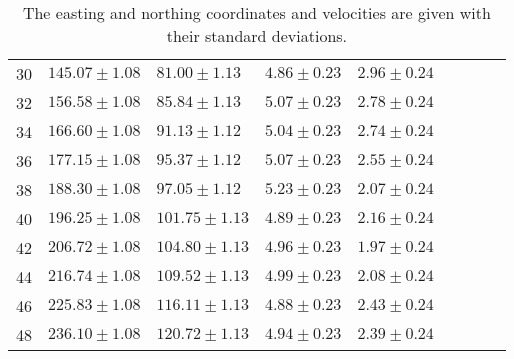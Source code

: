 \begin{table}[h]
\begin{center}
\begin{tabular}{lllllllll}
30 & $  145.07 \pm     1.08$ & $   81.00 \pm     1.13$ & $    4.86 \pm     0.23$ & $    2.96 \pm     0.24$  \\ 
32 & $  156.58 \pm     1.08$ & $   85.84 \pm     1.13$ & $    5.07 \pm     0.23$ & $    2.78 \pm     0.24$  \\ 
34 & $  166.60 \pm     1.08$ & $   91.13 \pm     1.12$ & $    5.04 \pm     0.23$ & $    2.74 \pm     0.24$  \\ 
36 & $  177.15 \pm     1.08$ & $   95.37 \pm     1.12$ & $    5.07 \pm     0.23$ & $    2.55 \pm     0.24$  \\ 
38 & $  188.30 \pm     1.08$ & $   97.05 \pm     1.12$ & $    5.23 \pm     0.23$ & $    2.07 \pm     0.24$  \\ 
40 & $  196.25 \pm     1.08$ & $  101.75 \pm     1.13$ & $    4.89 \pm     0.23$ & $    2.16 \pm     0.24$  \\ 
42 & $  206.72 \pm     1.08$ & $  104.80 \pm     1.13$ & $    4.96 \pm     0.23$ & $    1.97 \pm     0.24$  \\ 
44 & $  216.74 \pm     1.08$ & $  109.52 \pm     1.13$ & $    4.99 \pm     0.23$ & $    2.08 \pm     0.24$  \\ 
46 & $  225.83 \pm     1.08$ & $  116.11 \pm     1.13$ & $    4.88 \pm     0.23$ & $    2.43 \pm     0.24$  \\ 
48 & $  236.10 \pm     1.08$ & $  120.72 \pm     1.13$ & $    4.94 \pm     0.23$ & $    2.39 \pm     0.24$  \\ \bottomrule 
      \end{tabular} 
   \end{center}
\caption{The easting and northing coordinates and velocities are given with their standard deviations.} 
\label{tab:tableFiltered.tex} 
\end{table} 
